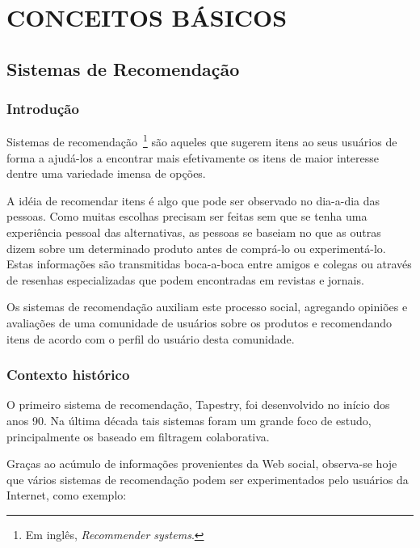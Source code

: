 \chapter{CONCEITOS BÁSICOS} %
\label{cha:conceitos_basicos}

\section{Sistemas de Recomendação}

\subsection{Introdução}
Sistemas de recomendação~\footnote{Em inglês, \textit{Recommender systems}.} são aqueles que sugerem itens ao seus usuários de forma a ajudá-los a encontrar mais efetivamente os itens de maior interesse dentre uma variedade imensa de opções.

A idéia de recomendar itens é algo que pode ser observado no dia-a-dia das pessoas. Como muitas escolhas precisam ser feitas sem que se tenha uma experiência pessoal das alternativas, as pessoas se baseiam no que as outras dizem sobre um determinado produto antes de comprá-lo ou experimentá-lo. Estas informações são transmitidas boca-a-boca entre amigos e colegas ou através de resenhas especializadas que podem encontradas em revistas e jornais.

Os sistemas de recomendação auxiliam este processo social, agregando opiniões e avaliações de uma comunidade de usuários sobre os produtos e recomendando itens de acordo com o perfil do usuário desta comunidade.

\subsection{Contexto histórico}
O primeiro sistema de recomendação, Tapestry\cite{Goldberg92}, foi desenvolvido no início dos anos 90. Na última década tais sistemas foram um grande foco de estudo, principalmente os baseado em filtragem colaborativa.~\cite{Resnick97}~\cite{Herlocker04}

Graças ao acúmulo de informações provenientes da Web social, observa-se hoje que vários sistemas de recomendação podem ser experimentados pelo usuários da Internet, como exemplo:

